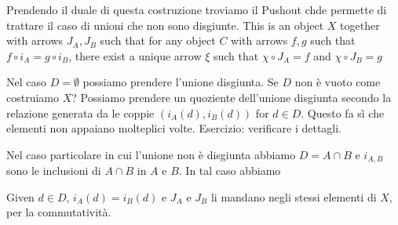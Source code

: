 \documentclass[a4paper]{article}
\begin{document}
Prendendo il duale di questa costruzione troviamo il Pushout chde permette di trattare
il caso di unioni che non sono disgiunte.
This is an object \(X\) together with arrows \(J_A, J_B\)
such that for any object \(C\) with arrows \(f,g\)
such that \(f \circ i_A = g \circ i_B\), there exist a unique
arrow \(\xi\)
such that \(\chi \circ J_A = f\) and \(\chi \circ J_B = g\)
\begin{center}
\end{center}

Nel caso \(D = \emptyset\) possiamo prendere l'unione disgiunta.
Se \(D\) non è vuoto come costruiamo \(X\)?
Possiamo prendere un quoziente dell'unione disgiunta
secondo la relazione generata da
le coppie \((i_A(d), i_B(d))\) for \(d \in D\).
Questo fa sì che elementi non appaiano molteplici volte.
Esercizio: verificare i dettagli.

Nel caso particolare in cui l'unione non è disgiunta abbiamo
\(D = A \cap B\) e \(i_{A,B}\) sono le inclusioni di
\(A \cap B\) in \(A\) e \(B\).
In tal caso abbiamo
Given \(d\in D\), \(i_A(d) = i_B(d)\) e \(J_A\) e \(J_B\)
li mandano negli stessi elementi di \(X\), per la commutatività.
\end{document}

